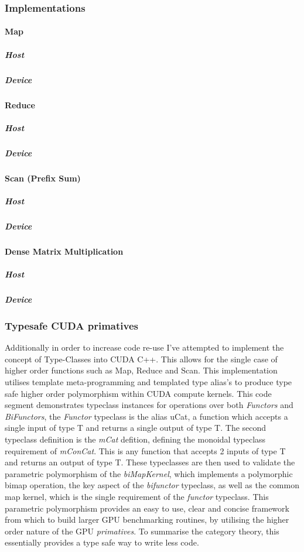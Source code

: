 \subsubsection{Implementations}

\paragraph{Map}
\subparagraph{Host}
\subparagraph{Device}

\paragraph{Reduce}
\subparagraph{Host}
\subparagraph{Device}

\paragraph{Scan (Prefix Sum)}
\subparagraph{Host}
\subparagraph{Device}

\paragraph{Dense Matrix Multiplication}
\subparagraph{Host}
\subparagraph{Device}


\subsubsection{Typesafe CUDA primatives}
Additionally in order to increase code re-use I've attempted to implement the concept of
Type-Classes into CUDA C++. This allows for the single case of higher order functions such as Map,
Reduce and Scan. This implementation utilises template meta-programming and templated type alias's
to produce type safe higher order polymorphism within CUDA compute kernels.
 This code segment demonstrates typeclass instances for
operations over both \textit{Functors} and \textit{BiFunctors}, the \textit{Functor} typeclass is
the alias uCat, a function which accepts a single input of type T and returns a single output of
type T. The second typeclass definition is the \textit{mCat} defition, defining the monoidal
typeclass requirement of \textit{mConCat}. This is any function that accepts 2 inputs of type T and
returns an output of type T. These typeclasses are then used to validate the parametric polymorphism
of the \textit{biMapKernel}, which implements a polymorphic bimap operation, the key aspect of the
\textit{bifunctor} typeclass, as well as the common map kernel, which is the single requirement of
the \textit{functor} typeclass. This parametric polymorphism provides an easy to use, clear and
concise framework from which to build larger GPU benchmarking routines, by utilising the higher
order nature of the GPU \textit{primatives}. To summarise the category theory, this essentially
provides a type safe way to write less code.
